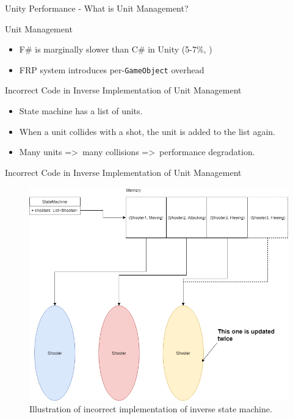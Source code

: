 \begin{frame}{\secname}{\subsecname}
	Unity Performance - What is Unit Management?
\end{frame}

\begin{frame}{\secname}{\subsecname}
	Unit Management
	\begin{itemize}
		\item<2-> F\# is marginally slower than C\# in Unity (5-7\%, \cite{maggiore2012formal,bolhuis2019gameplay})
		\item<3-> FRP system introduces per-\texttt{GameObject} overhead
	\end{itemize}
\end{frame}

\begin{frame}{\secname}{\subsecname}
	Incorrect Code in Inverse Implementation of Unit Management
	\begin{itemize}
		\item<1-> State machine has a list of units.
		\item<2-> When a unit collides with a shot, the unit is added to the list again.
		\item<3-> Many units =\textgreater\ many collisions =\textgreater\ performance degradation.
	\end{itemize}
\end{frame}

\begin{frame}{\secname}{\subsecname}
	Incorrect Code in Inverse Implementation of Unit Management
	\begin{figure}[h!]
		\centering
		\includegraphics[width=.7\textwidth]{pictures/statemachine.png}
		\caption{Illustration of incorrect implementation of inverse state machine.}
		\label{fig:incorrect:statemachine}
	\end{figure}
\end{frame}

